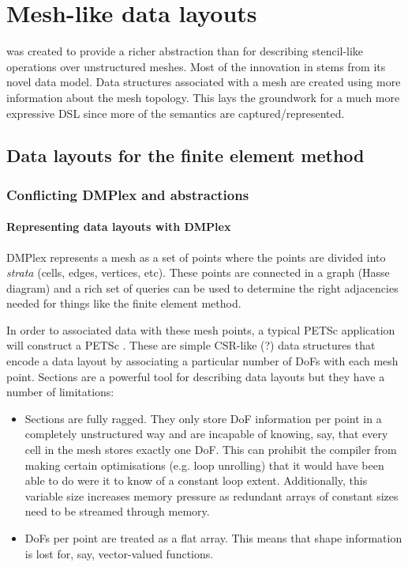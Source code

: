 \documentclass[thesis]{subfiles}
\begin{document}
\chapter{Mesh-like data layouts}
\label{chapter:mesh_data_layouts}

 was created to provide a richer abstraction than  for describing stencil-like operations over unstructured meshes.
Most of the innovation in  stems from its novel data model.
Data structures associated with a mesh are created using more information about the mesh topology.
This lays the groundwork for a much more expressive DSL since more of the semantics are captured/represented.

\section{Data layouts for the finite element method}


\subsection{Conflicting DMPlex and  abstractions}

\subsubsection{Representing data layouts with DMPlex}

DMPlex represents a mesh as a set of points where the points are divided into \textit{strata} (cells, edges, vertices, etc).
These points are connected in a graph (Hasse diagram) and a rich set of queries can be used to determine the right adjacencies needed for things like the finite element method.

In order to associated data with these mesh points, a typical PETSc application will construct a PETSc .
These are simple CSR-like (?) data structures that encode a data layout by associating a particular number of DoFs with each mesh point.
Sections are a powerful tool for describing data layouts but they have a number of limitations:

\begin{itemize}
  \item
    Sections are fully ragged.
    They only store DoF information per point in a completely unstructured way and are incapable of knowing, say, that every cell in the mesh stores exactly one DoF.
    This can prohibit the compiler from making certain optimisations (e.g. loop unrolling) that it would have been able to do were it to know of a constant loop extent.
    Additionally, this variable size increases memory pressure as redundant arrays of constant sizes need to be streamed through memory.

  \item
    DoFs per point are treated as a flat array.
    This means that shape information is lost for, say, vector-valued functions.
\end{itemize}
\end{document}
